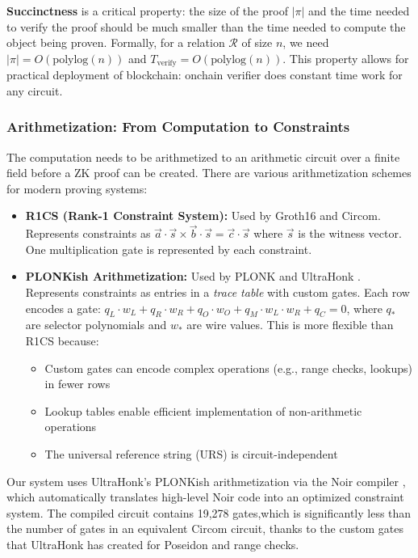 \documentclass[12pt, a4paper]{report}
\begin{document}
\textbf{Succinctness} is a critical property: the size of the proof $|\pi|$ and the time needed to verify the proof should be much smaller than the time needed to compute the object being proven. Formally, for a relation $\mathcal{R}$ of size $n$, we need $|\pi| = O(\text{polylog}(n))$ and $T_{\text{verify}} = O(\text{polylog}(n))$. This property allows for practical deployment of blockchain: onchain verifier does constant time work for any circuit.

\subsubsection{Arithmetization: From Computation to Constraints}

The computation needs to be arithmetized to an arithmetic circuit over a finite field before a ZK proof can be created. There are various arithmetization schemes for modern proving systems:

\begin{itemize}
    \item \textbf{R1CS (Rank-1 Constraint System):} Used by Groth16 and Circom. Represents constraints as $\vec{a} \cdot \vec{s} \times \vec{b} \cdot \vec{s} = \vec{c} \cdot \vec{s}$ where $\vec{s}$ is the witness vector. One multiplication gate is represented by each constraint.
    
    \item \textbf{PLONKish Arithmetization:} Used by PLONK \cite{gabizon2019plonk} and UltraHonk \cite{aztec2024ultrahonk}. Represents constraints as entries in a \textit{trace table} with custom gates. Each row encodes a gate: $q_L \cdot w_L + q_R \cdot w_R + q_O \cdot w_O + q_M \cdot w_L \cdot w_R + q_C = 0$, where $q_*$ are selector polynomials and $w_*$ are wire values. This is more flexible than R1CS because:
    \begin{itemize}
        \item Custom gates can encode complex operations (e.g., range checks, lookups) in fewer rows
        \item Lookup tables enable efficient implementation of non-arithmetic operations
        \item The universal reference string (URS) is circuit-independent
    \end{itemize}
\end{itemize}

Our system uses UltraHonk's PLONKish arithmetization via the Noir compiler \cite{noir2024docs}, which automatically translates high-level Noir code into an optimized constraint system. The compiled circuit contains 19,278 gates,which is significantly less than the number of gates in an equivalent Circom circuit, thanks to the custom gates that UltraHonk has created for Poseidon and range checks.
\end{document}
